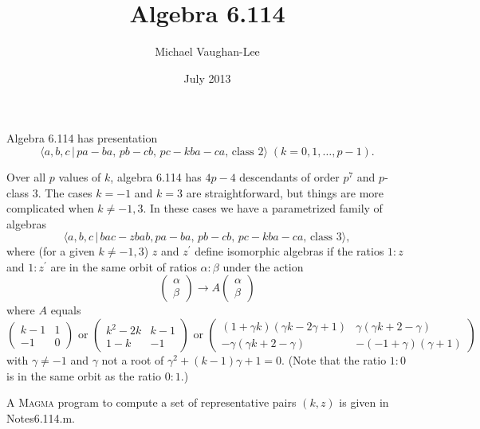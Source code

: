 \documentclass[12pt]{article}
\begin{document}
\title{Algebra 6.114}
\author{Michael Vaughan-Lee}
\date{July 2013}
\maketitle

Algebra 6.114 has presentation%
\[
\langle a,b,c\,|\,pa-ba,\,pb-cb,\,pc-kba-ca,\,\text{class }2\rangle
\;(k=0,1,\ldots ,p-1). 
\]

Over all $p$ values of $k$, algebra 6.114 has $4p-4$ descendants of order $%
p^{7}$ and $p$-class 3. The cases $k=-1$ and $k=3$ are straightforward, but
things are more complicated when $k\neq -1,3$. In these cases we have a
parametrized family of algebras%
\[
\langle a,b,c\,|\,bac-zbab,pa-ba,\,pb-cb,\,pc-kba-ca,\,\text{class }3\rangle
,
\]%
where (for a given $k\neq -1,3$) $z$ and $z^{\prime }$ define isomorphic
algebras if the ratios $1:z$ and $1:z^{\prime }$ are in the same orbit of
ratios $\alpha :\beta $ under the action%
\[
\left( 
\begin{array}{c}
\alpha  \\ 
\beta 
\end{array}%
\right) \rightarrow A\left( 
\begin{array}{c}
\alpha  \\ 
\beta 
\end{array}%
\right) 
\]%
where $A$ equals%
\[
\left( 
\begin{array}{cc}
k-1 & 1 \\ 
-1 & 0%
\end{array}%
\right) \text{ or }\left( 
\begin{array}{cc}
k^{2}-2k & k-1 \\ 
1-k & -1%
\end{array}%
\right) \text{ or }\left( 
\begin{array}{cc}
\allowbreak \left( 1+\gamma k\right) \left( \gamma k-2\gamma +1\right)  & 
\allowbreak \gamma \left( \gamma k+2-\gamma \right)  \\ 
-\gamma \left( \gamma k+2-\gamma \right)  & -\left( -1+\gamma \right) \left(
\gamma +1\right) 
\end{array}%
\right) 
\]%
with $\gamma \neq -1$ and $\gamma $ not a root of $\allowbreak \gamma
^{2}+(k-1)\gamma +1=0$. (Note that the ratio $1:0$ is in the same orbit as
the ratio $0:1$.)

A \textsc{Magma} program to compute a set of representative pairs $(k,z)$ is
given in Notes6.114.m.
\end{document}

